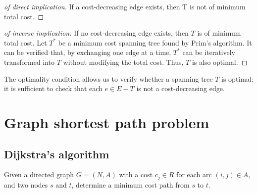 \documentclass[12pt, a4paper]{report}
\newtheorem[style=M,bodystyle=\normalfont]{proposition}{Proposition}
\newtheorem[style=M,bodystyle=\normalfont]{theorem}{Theorem}
\newtheorem[style=M,bodystyle=\normalfont]{corollary}{Corollary}
\newtheorem[style=M,bodystyle=\normalfont]{lemma}{Lemma}
\newtheorem[style=M,bodystyle=\normalfont]{definition}{Definition}
\begin{document}
    \begin{proof}[of direct implication]
        If a cost-decreasing edge exists, then T is not of minimum total cost.
    \end{proof}
    \begin{proof}[of inverse implication]
        If no cost-decreasing edge exists, then $T$ is of minimum total cost. Let $T^{*}$ be a minimum cost spanning tree found by Prim's algorithm. It can be verified that, by 
        exchanging one edge at a time, $T^{*}$ can be iteratively transformed into $T$ without modifying the total cost. Thus, $T$ is also optimal. 
    \end{proof}
    The optimality condition allows us to verify whether a spanning tree $T$ is optimal: it is sufficient to check that each $e \in E-T$ is not a cost-decreasing edge. 

    \section{Graph shortest path problem}
    \subsection{Dijkstra's algorithm}
    Given a directed graph $G=(N,A)$ with a cost $c_j \in R$ for each arc $(i,j) \in A$, and two nodes $s$ and $t$, determine a minimum cost path from $s$ to $t$. 
\end{document}
